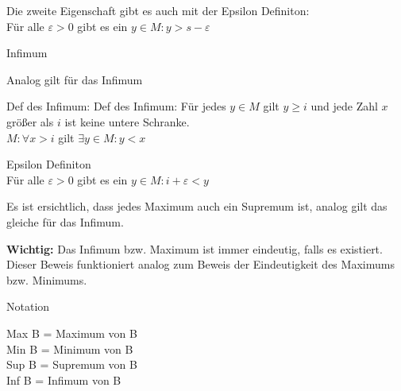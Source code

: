 \documentclass[smallheadings,headsepline,12pt,a4paper]{scrartcl}
\begin{document}
\item Die zweite Eigenschaft gibt es auch mit der Epsilon Definiton: \\
Für alle $ \varepsilon > 0 $ gibt es ein $ y \in M : y > s - \varepsilon $

\newpage
 

\begin{center}
\item[Infimum]
\end{center}
\item Analog gilt für das Infimum
\item Def des Infimum: Def des Infimum:
Für jedes $ y \in M $ gilt $ y \geq i $
und jede Zahl $x$ größer als $i$ ist keine untere Schranke. \\
$ M: \forall x > i $ gilt $ \exists y \in M : y < x $ \\
\item Epsilon Definiton \\
Für alle $ \varepsilon > 0 $ gibt es ein $ y \in M : i+ \varepsilon < y $ \\

\item Es ist ersichtlich, dass jedes Maximum auch ein Supremum ist, analog gilt das gleiche für das Infimum.
\item \textbf{Wichtig:} Das Infimum bzw. Maximum ist immer eindeutig, falls es existiert. Dieser Beweis funktioniert analog zum Beweis der Eindeutigkeit des Maximums bzw. Minimums.

\begin{center}
\item[Notation]
\end{center}
\item Max B = Maximum von B \\
Min B = Minimum von B \\
Sup B = Supremum von B \\
Inf B = Infimum von B \\

\newpage
\end{document}
